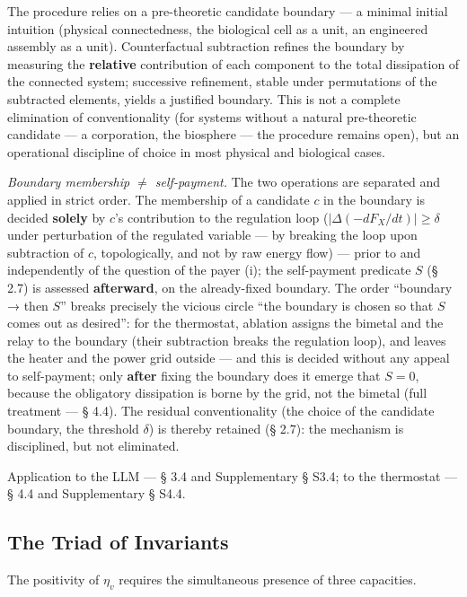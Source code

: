 \documentclass[pdflatex,sn-mathphys-ay]{sn-jnl}
\begin{document}
The procedure relies on a pre-theoretic candidate boundary --- a minimal initial intuition (physical connectedness, the biological cell as a unit, an engineered assembly as a unit). Counterfactual subtraction refines the boundary by measuring the \textbf{relative} contribution of each component to the total dissipation of the connected system; successive refinement, stable under permutations of the subtracted elements, yields a justified boundary. This is not a complete elimination of conventionality (for systems without a natural pre-theoretic candidate --- a corporation, the biosphere --- the procedure remains open), but an operational discipline of choice in most physical and biological cases.

\emph{Boundary membership \ensuremath{\ne} self-payment.} The two operations are separated and applied in strict order. The membership of a candidate \(c\) in the boundary is decided \textbf{solely} by \(c\)'s contribution to the regulation loop (\(|\Delta(-dF_X/dt)| \ge \delta\) under perturbation of the regulated variable --- by breaking the loop upon subtraction of \(c\), topologically, and not by raw energy flow) --- prior to and independently of the question of the payer (i); the self-payment predicate \(S\) (§ 2.7) is assessed \textbf{afterward}, on the already-fixed boundary. The order ``boundary → then \(S\)'' breaks precisely the vicious circle ``the boundary is chosen so that \(S\) comes out as desired'': for the thermostat, ablation assigns the bimetal and the relay to the boundary (their subtraction breaks the regulation loop), and leaves the heater and the power grid outside --- and this is decided without any appeal to self-payment; only \textbf{after} fixing the boundary does it emerge that \(S = 0\), because the obligatory dissipation is borne by the grid, not the bimetal (full treatment --- § 4.4). The residual conventionality (the choice of the candidate boundary, the threshold \(\delta\)) is thereby retained (§ 2.7): the mechanism is disciplined, but not eliminated.

Application to the LLM --- § 3.4 and Supplementary § S3.4; to the thermostat --- § 4.4 and Supplementary § S4.4.

\subsection{The Triad of Invariants}\label{the-triad-of-invariants}

The positivity of \(\eta_v\) requires the simultaneous presence of three capacities.
\end{document}
